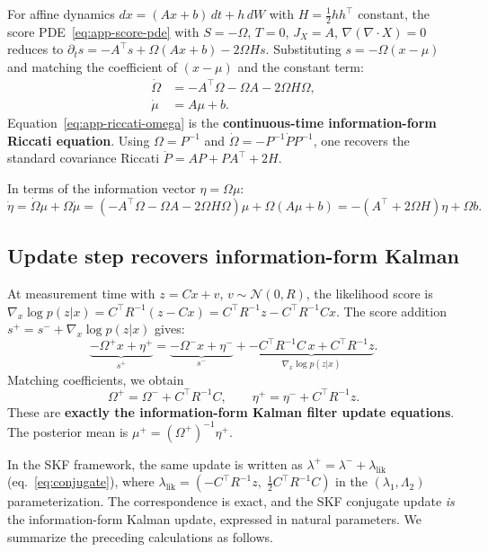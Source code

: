 \documentclass{article}
\theoremstyle{definition}
\begin{document}
For affine dynamics $dx = (Ax+b)\,dt + h\,dW$ with $H = \frac{1}{2}hh^\top$ constant,
the score PDE~\eqref{eq:app-score-pde} with $S = -\Omega$, $T = 0$,
$J_X = A$, $\nabla(\nabla\cdot X) = 0$ reduces to
$\partial_t s = -A^\top s + \Omega(Ax+b) - 2\Omega Hs$.
Substituting $s = -\Omega(x - \mu)$ and matching the coefficient of
$(x - \mu)$ and the constant term:
\begin{align}
    \dot{\Omega} &= -A^\top \Omega - \Omega A - 2\Omega H\Omega,
    \label{eq:app-riccati-omega} \\
    \dot{\mu} &= A\mu + b. \label{eq:app-mean-ode}
\end{align}
Equation~\eqref{eq:app-riccati-omega} is the \textbf{continuous-time
information-form Riccati equation}.
Using $\Omega = P^{-1}$ and $\dot{\Omega} = -P^{-1}\dot{P}P^{-1}$,
one recovers the standard covariance Riccati
$\dot{P} = AP + PA^\top + 2H$.

In terms of the information vector $\eta = \Omega\mu$:
\begin{equation}\label{eq:app-riccati-eta}
    \dot{\eta} = \dot{\Omega}\mu + \Omega\dot{\mu}
    = (-A^\top\Omega - \Omega A - 2\Omega H\Omega)\mu + \Omega(A\mu + b)
    = -(A^\top + 2\Omega H)\eta + \Omega b.
\end{equation}

\subsection{Update step recovers information-form Kalman}\label{app:kalman-update}

At measurement time with $z = Cx + v$, $v \sim \mathcal{N}(0, R)$,
the likelihood score is
$\nabla_x \log p(z|x) = C^\top R^{-1}(z - Cx)
= C^\top R^{-1}z - C^\top R^{-1}Cx$.
The score addition $s^+ = s^- + \nabla_x \log p(z|x)$ gives:
\[
    \underbrace{-\Omega^+ x + \eta^+}_{s^+}
    = \underbrace{-\Omega^- x + \eta^-}_{s^-}
    + \underbrace{-C^\top R^{-1}C\, x + C^\top R^{-1}z}_{\nabla_x \log p(z|x)}.
\]
Matching coefficients, we obtain
\begin{equation}\label{eq:info-kalman-update}
    \boxed{
    \Omega^+ = \Omega^- + C^\top R^{-1}C, \qquad
    \eta^+ = \eta^- + C^\top R^{-1}z.
    }
\end{equation}
These are \textbf{exactly the information-form Kalman filter update equations}.
The posterior mean is $\mu^+ = (\Omega^+)^{-1}\eta^+$.

In the SKF framework, the same update is written as
$\lambda^+ = \lambda^- + \lambda_{\mathrm{lik}}$
(eq.~\eqref{eq:conjugate}), where
$\lambda_{\mathrm{lik}} = (-C^\top R^{-1}z,\; \frac{1}{2}C^\top R^{-1}C)$
in the $(\lambda_1, \Lambda_2)$ parameterization.
The correspondence is exact, and the SKF conjugate update \emph{is} the
information-form Kalman update, expressed in natural parameters.
We summarize the preceding calculations as follows.
\end{document}
